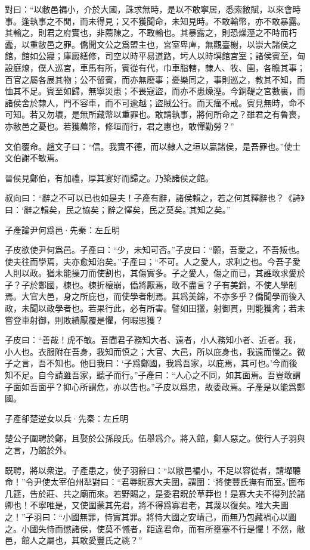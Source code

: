 \documentclass[12pt,a4paper]{ctexbook}
\begin{document}
對曰：“以敝邑褊小，介於大國，誅求無時，是以不敢寧居，悉索敝賦，以來會時事。逢執事之不閒，而未得見；又不獲聞命，未知見時。不敢輸幣，亦不敢暴露。其輸之，則君之府實也，非薦陳之，不敢輸也。其暴露之，則恐燥溼之不時而朽蠹，以重敝邑之罪。僑聞文公之爲盟主也，宮室卑庳，無觀臺榭，以崇大諸侯之館，館如公寢；庫廄繕修，司空以時平易道路，圬人以時塓館宮室；諸侯賓至，甸設庭燎，僕人巡宮，車馬有所，賓從有代，巾車脂轄，隸人、牧、圉，各瞻其事；百官之屬各展其物；公不留賓，而亦無廢事；憂樂同之，事則巡之，教其不知，而恤其不足。賓至如歸，無寧災患；不畏寇盜，而亦不患燥溼。今銅鞮之宮數裏，而諸侯舍於隸人，門不容車，而不可逾越；盜賊公行。而天癘不戒。賓見無時，命不可知。若又勿壞，是無所藏幣以重罪也。敢請執事，將何所命之？雖君之有魯喪，亦敝邑之憂也。若獲薦幣，修垣而行，君之惠也，敢憚勤勞？”\par
文伯覆命。趙文子曰：“信。我實不德，而以隸人之垣以贏諸侯，是吾罪也。”使士文伯謝不敏焉。\par
晉侯見鄭伯，有加禮，厚其宴好而歸之。乃築諸侯之館。\par
叔向曰：“辭之不可以已也如是夫！子產有辭，諸侯賴之，若之何其釋辭也？《詩》曰：‘辭之輯矣，民之協矣；辭之懌矣，民之莫矣。’其知之矣。”\par
子產論尹何爲邑·先秦：左丘明 \par
子皮欲使尹何爲邑。子產曰：“少，未知可否。”子皮曰：“願，吾愛之，不吾叛也。使夫往而學焉，夫亦愈知治矣。”子產曰；“不可。人之愛人，求利之也。今吾子愛人則以政。猶未能操刀而使割也，其傷實多。子之愛人，傷之而已，其誰敢求愛於子？子於鄭國，棟也。棟折榱崩，僑將厭焉，敢不盡言？子有美錦，不使人學制焉。大官大邑，身之所庇也，而使學者制焉。其爲美錦，不亦多乎？僑聞學而後入政，未聞以政學者也。若果行此，必有所害。譬如田獵，射御貫，則能獲禽；若未嘗登車射御，則敗績厭覆是懼，何暇思獲？\par
子皮曰：“善哉！虎不敏。吾聞君子務知大者、遠者，小人務知小者、近者。我，小人也。衣服附在吾身，我知而慎之；大官、大邑，所以庇身也，我遠而慢之。微子之言，吾不知也。他日我曰：‘子爲鄭國，我爲吾家，以庇焉，其可也。’今而後知不足。自今請雖吾家，聽子而行。”子產曰：“人心之不同，如其面焉。吾豈敢謂子面如吾面乎？抑心所謂危，亦以告也。”子皮以爲忠，故委政焉。子產是以能爲鄭國。\par
子產卻楚逆女以兵·先秦：左丘明 \par
楚公子圍聘於鄭，且娶於公孫段氏。伍舉爲介。將入館，鄭人惡之。使行人子羽與之言，乃館於外。\par
既聘，將以衆逆。子產患之，使子羽辭曰：“以敝邑褊小，不足以容從者，請墠聽命！”令尹使太宰伯州犁對曰：“君辱貺寡大夫圍，謂圍：‘將使豐氏撫有而室。’圍布几筵，告於莊、共之廟而來。若野賜之，是委君貺於草莽也！是寡大夫不得列於諸卿也！不寧唯是，又使圍蒙其先君，將不得爲寡君老，其蔑以復矣。唯大夫圖之！”子羽曰：“小國無罪，恃實其罪。將恃大國之安靖己，而無乃包藏禍心以圖之。小國失恃而懲諸侯，使莫不憾者，距違君命，而有所壅塞不行是懼！不然，敝邑，館人之屬也，其敢愛豐氏之祧？”\par
\end{document}
